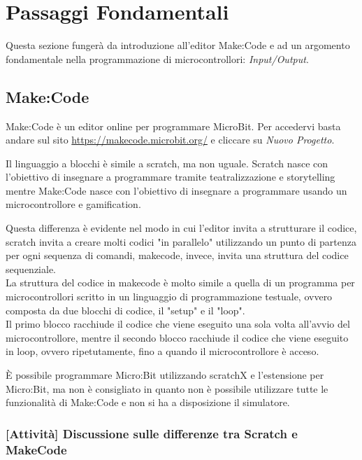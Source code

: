 \documentclass[../../docenti.tex]{subfiles}
\begin{document}
\section{Passaggi Fondamentali}
Questa sezione fungerà da introduzione all'editor Make:Code e ad un argomento fondamentale nella programmazione di microcontrollori: \textit{Input/Output}.

\subsection{Make:Code}
Make:Code è un editor online per programmare MicroBit. Per accedervi basta andare sul sito \url{https://makecode.microbit.org/} e cliccare su \textit{Nuovo Progetto}.

Il linguaggio a blocchi è simile a scratch, ma non uguale. Scratch nasce con l'obiettivo di insegnare a programmare tramite teatralizzazione e storytelling mentre Make:Code nasce con l'obiettivo di insegnare a programmare usando un microcontrollore e gamification.

Questa differenza è evidente nel modo in cui l'editor invita a strutturare il codice, scratch invita a creare molti codici "in parallelo" utilizzando un punto di partenza per ogni sequenza di comandi, makecode, invece, invita una struttura del codice sequenziale.\\
La struttura del codice in makecode è molto simile a quella di un programma per microcontrollori scritto in un linguaggio di programmazione testuale, ovvero composta da due blocchi di codice, il "setup" e il "loop".\\
Il primo blocco racchiude il codice che viene eseguito una sola volta all'avvio del microcontrollore, mentre il secondo blocco racchiude il codice che viene eseguito in loop, ovvero ripetutamente, fino a quando il microcontrollore è acceso.

È possibile programmare Micro:Bit utilizzando scratchX e l'estensione per Micro:Bit, ma non è consigliato in quanto non è possibile utilizzare tutte le funzionalità di Make:Code e non si ha a disposizione il simulatore.



\subsubsection{[Attività] Discussione sulle differenze tra Scratch e MakeCode}

\end{document}
